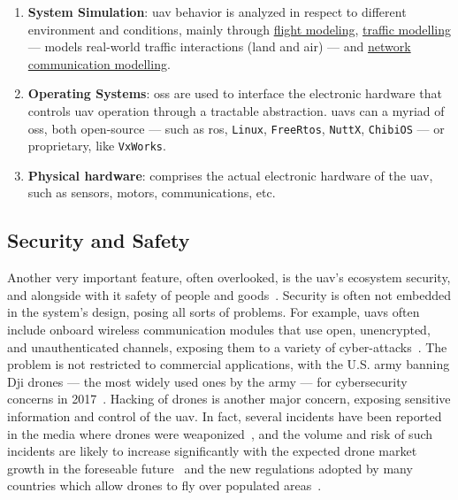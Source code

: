 \begin{enumerate}
  safely, through the transmission of commands to the \gls{uav}, yielded by an
  human operator of computer-generated via autopilot. The command is sent to the
  \gls{uav} via proprietary protocols or open \glspl{api} (e.g., MAVLink
  \gls{sdk} or Parrot \gls{sdk}). The autopilot consists in software stack
  running on the \gls{fcs}. Noticeable open-source autopilots are
  \lstinline{PX4}, \lstinline{ArduPilot}, and \lstinline{Paparazzi}.
\item \textbf{System Simulation}: \gls{uav} behavior is analyzed in respect to
  different environment and conditions, mainly through \underline{flight
    modeling},
  \underline{traffic modelling} --- models real-world traffic interactions
  (land and air) --- and
  \underline{network communication modelling}. 
\item \textbf{Operating Systems}: \glspl{os} are used to interface the
  electronic hardware that controls \gls{uav} operation through a tractable
  abstraction. \glspl{uav} can a myriad of \glspl{os}, both open-source --- such as
  \gls{ros}, \lstinline{Linux}, \lstinline{FreeRtos}, \lstinline{NuttX}, \lstinline{ChibiOS} --- or proprietary, like \lstinline{VxWorks}. 
\item \textbf{Physical hardware}: comprises the actual electronic hardware of
  the \gls{uav}, such as sensors, motors, communications, etc.
\end{enumerate}


\subsection{Security and Safety}%
\label{sec:security-safety}
Another very important feature, often overlooked, is the \gls{uav}'s ecosystem
security, and alongside with it safety of people and goods~\cite{leccadito2018survey}. Security is often
not embedded in the system's design, posing all sorts of problems. For example,
\glspl{uav} often include onboard wireless communication modules that use open,
unencrypted, and unauthenticated channels, exposing them to a variety of
cyber-attacks~\cite{kishnaCyberVulnerUAVReview2017,mansfieldUAVCyberThreats2013}.
The problem is not restricted to
commercial applications, with the U.S. army banning Dji drones --- the most
widely used ones by the army --- for cybersecurity
concerns in 2017~\cite{suasNewsDjiDronesBanned2017}. Hacking of drones is
another major concern, exposing sensitive information and control of the
\gls{uav}. In fact, several incidents have been reported in the media where
drones were weaponized~\cite{spiegelUAVAccident2015,nytimesUAVAccident2018,theDriveUAVAccident2019}, and the volume and risk of such incidents are
likely to increase significantly with the expected drone market growth in the
foreseable future~\cite{mohsan2022towards} and the new regulations adopted by many countries which allow
drones to fly over populated areas~\cite{stocker2017UAVRegulationsReview}.

